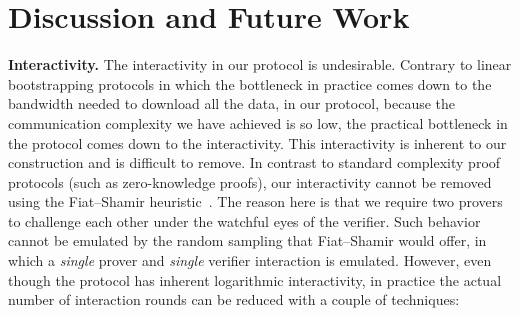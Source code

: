 \section{Discussion and Future Work}

\noindent
\textbf{Interactivity.}
The interactivity in our protocol is undesirable. Contrary to linear bootstrapping protocols in which the
bottleneck in practice comes down to the bandwidth needed to download all the data, in our protocol,
because the communication complexity we have achieved is so low,
the practical bottleneck in the protocol comes down to the interactivity.
This interactivity is inherent to our construction and is difficult to remove.
In contrast to standard complexity
proof protocols (such as zero-knowledge proofs), our interactivity cannot be removed using the Fiat--Shamir
heuristic~\cite{fiatshamir}. The reason here is that we require two provers to challenge each other under the watchful
eyes of the verifier. Such behavior cannot be emulated by the random sampling that Fiat--Shamir would offer,
in which a \emph{single} prover and \emph{single} verifier interaction is emulated.
However, even though the protocol has inherent logarithmic interactivity, in practice the actual number
of interaction rounds can be reduced with a couple of techniques:

